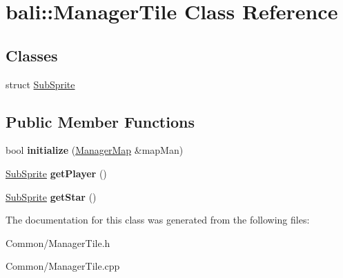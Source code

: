 \hypertarget{classbali_1_1_manager_tile}{\section{bali\-:\-:Manager\-Tile Class Reference}
\label{classbali_1_1_manager_tile}
}
\subsection*{Classes}
\begin{DoxyCompactItemize}
\item 
struct \hyperlink{structbali_1_1_manager_tile_1_1_sub_sprite}{Sub\-Sprite}
\end{DoxyCompactItemize}
\subsection*{Public Member Functions}
\begin{DoxyCompactItemize}
\item 
\hypertarget{classbali_1_1_manager_tile_a6c065cec708c6ce0ed1fdb7085ce06a1}{bool {\bfseries initialize} (\hyperlink{classbali_1_1_manager_map}{Manager\-Map} \&map\-Man)}\label{classbali_1_1_manager_tile_a6c065cec708c6ce0ed1fdb7085ce06a1}

\item 
\hypertarget{classbali_1_1_manager_tile_a428c4e4f03926d38bfcd9ec1c1a42fc5}{\hyperlink{structbali_1_1_manager_tile_1_1_sub_sprite}{Sub\-Sprite} {\bfseries get\-Player} ()}\label{classbali_1_1_manager_tile_a428c4e4f03926d38bfcd9ec1c1a42fc5}

\item 
\hypertarget{classbali_1_1_manager_tile_a3e1574ae9ea8026c81dff4174c0eeffe}{\hyperlink{structbali_1_1_manager_tile_1_1_sub_sprite}{Sub\-Sprite} {\bfseries get\-Star} ()}\label{classbali_1_1_manager_tile_a3e1574ae9ea8026c81dff4174c0eeffe}

\end{DoxyCompactItemize}


The documentation for this class was generated from the following files\-:\begin{DoxyCompactItemize}
\item 
Common/Manager\-Tile.\-h\item 
Common/Manager\-Tile.\-cpp\end{DoxyCompactItemize}
